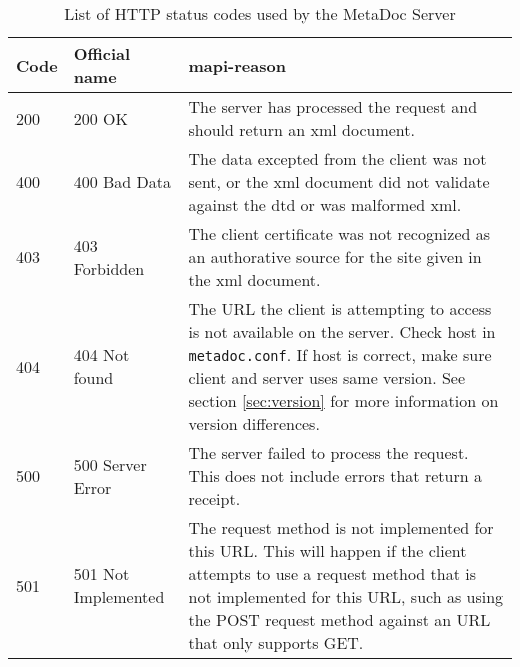 \begin{table}[h!]
    \centering
    \caption{List of HTTP status codes used by the MetaDoc Server}
    \begin{tabular}{|l|l|p{7cm}|}
        \hline
        \textbf{Code} & \textbf{Official name} & \textbf{\gls{mapi}-reason} \\
        \hline
        200 & 200 OK & The server has processed the request and should return
        an \gls{xml} document. \\
        \hline
        400 & 400 Bad Data & The data excepted from the client was not sent, or
        the \gls{xml} document did not validate against the \gls{dtd} or was
        malformed \gls{xml}. \\
        \hline
        403 & 403 Forbidden & The client certificate was not recognized as an
        authorative source for the site given in the \gls{xml} document. \\
        \hline
        404 & 404 Not found & The URL the client is attempting to access is not
        available on the server. Check host in \texttt{metadoc.conf}. If host
        is correct, make sure client and server uses same version. See section
        \ref{sec:version} for more information on version differences. \\ 
        \hline
        500 & 500 Server Error & The server failed to process the request. This
        does not include errors that return a receipt. \\
        \hline
        501 & 501 Not Implemented & The request method is not implemented for
        this URL. This will happen if the client attempts to use a request
        method that is not implemented for this URL, such as using the POST
        request method against an URL that only supports GET. \\
        \hline
    \end{tabular}
    \label{tbl:http_status_codes}
\end{table}
